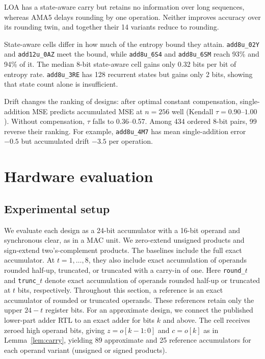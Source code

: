 \documentclass[preprint,12pt,numbers]{elsarticle}
\theoremstyle{definition}
\begin{document}
LOA has a state-aware carry but retains no information over long
sequences, whereas AMA5 delays rounding by one operation. Neither improves
accuracy over its rounding twin, and together their 14 variants reduce
to rounding.

State-aware cells differ in how much of the entropy bound they attain.
\texttt{add8u\_02Y} and \texttt{add12u\_0AZ} meet the bound, while
\texttt{add8u\_6S4} and \texttt{add8u\_6SM} reach 93\% and 94\% of it.
The median 8-bit state-aware cell gains only 0.32 bits per bit of entropy
rate. \texttt{add8u\_3RE} has 128 recurrent states but gains only
2 bits, showing that state count alone is insufficient.

Drift changes the ranking of designs: after optimal constant compensation,
single-addition MSE predicts accumulated MSE at $n=256$ well (Kendall
$\tau=0.90$--$1.00$). Without compensation, $\tau$ falls to 0.36--0.57.
Among 434 ordered 8-bit pairs, 99 reverse their ranking. For example,
\texttt{add8u\_4M7} has mean single-addition error $-0.5$ but accumulated
drift $-3.5$ per operation.

\section{Hardware evaluation}
\label{sec:hw}

\subsection{Experimental setup}

We evaluate each design as a 24-bit accumulator with a 16-bit operand
and synchronous clear, as in a MAC unit. We zero-extend unsigned
products and sign-extend two's-complement products. The baselines
include the full exact accumulator. At $t=1,\ldots,8$, they also
include exact accumulation of operands rounded half-up, truncated,
or truncated with a carry-in of one.
Here \texttt{round\_$t$} and \texttt{trunc\_$t$} denote exact accumulation
of operands rounded half-up or truncated at $t$ bits, respectively.
Throughout this section, a reference is an exact accumulator of rounded
or truncated operands.
These references retain only the upper $24-t$ register bits. For an
approximate design, we connect the published lower-part adder RTL to an
exact adder for bits $k$ and above. The cell receives zeroed high
operand bits, giving
$z=o[k{-}1{:}0]$ and $c=o[k]$ as in Lemma~\ref{lem:carry}, yielding
89 approximate and 25 reference accumulators for each operand variant
(unsigned or signed products).
\end{document}
